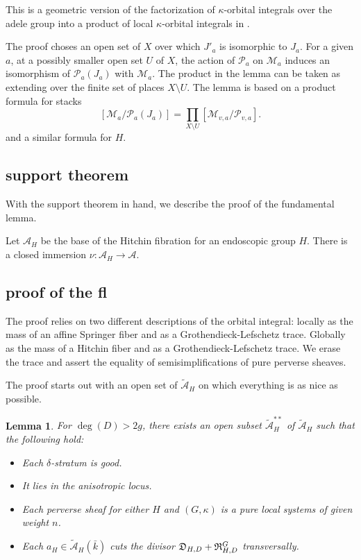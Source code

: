 \documentclass[brochure,english,12pt]{bourbaki}
\newtheorem{lemma}[equation]{Lemma}
\def\A{{\mathcal A}}
\def\M{{\mathcal M}}
\def\P{{\mathcal P}}
\def\tA{{\tilde{\mathcal A}}}
\def\D{{\frak{D}}}
\def\R{{\frak{R}}}
\begin{document}
This is a geometric version of the factorization of $\kappa$-orbital
integrals over the adele group into a product of local
$\kappa$-orbital integrals in \cite{Debuts}.

The proof choses an open set of $X$ over which $J'_a$ is isomorphic to
$J_a$. For a given $a$, at a possibly smaller open set $U$ of $X$, the
action of $\P_a$ on $\M_a$ induces an isomorphism of $\P_a(J_a)$ with
$\M_a$.  The product in the lemma can be taken as extending over the
finite set of places $X\setminus U$.  The lemma is based on a product
formula for stacks
\[
[\M_a/\P_a(J_a)] = \prod_{X\setminus U} [\M_{v,a}/\P_{v,a}].
\]
and a similar formula for $H$.

\subsection{support theorem}



With the support theorem in hand, we describe the proof of the fundamental lemma.

Let $\A_H$ be the base of the Hitchin fibration for an endoscopic group $H$.  There
is a closed immersion $\nu:\A_H\to\A$.

\subsection{proof of the fl}

The proof relies on two different descriptions of the orbital integral:
locally as the mass of an affine Springer fiber and as a Grothendieck-Lefschetz trace.
Globally as the mass of a Hitchin fiber and as a Grothendieck-Lefschetz trace.
We erase the trace and assert the equality of semisimplifications of pure perverse sheaves.

The proof starts out with an open set of $\tA_H$ on which everything is as nice as possible.

\begin{lemma}  For $\deg(D)>2g$, 
there exists an open subset $\tA_H^{**}$ of $\tA_H$ such that the following hold:
\begin{itemize}
\item Each $\delta$-stratum is good.
\item It lies in the anisotropic locus.
\item Each  perverse sheaf for either $H$ and $(G,\kappa)$ is a pure local systems of given weight $n$.
\item Each $a_H\in \tA_H(\bar k)$ cuts the divisor $\D_{H,D}+\R^G_{H,D}$ transversally.
\end{itemize}
\end{lemma}
\end{document}
